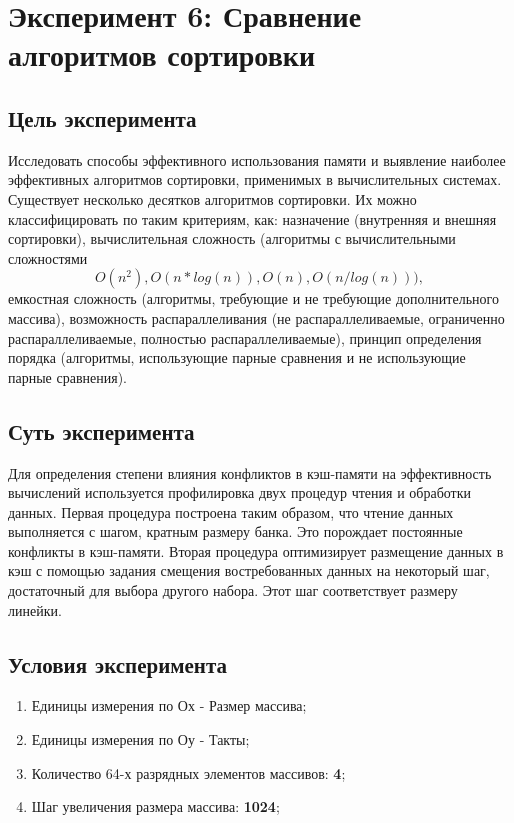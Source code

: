 \chapter{Эксперимент 6: Сравнение алгоритмов сортировки}

\section{Цель эксперимента}
Исследовать способы эффективного использования памяти и выявление наиболее эффективных алгоритмов сортировки, применимых в вычислительных системах. 
Существует несколько десятков алгоритмов сортировки. Их можно классифицировать по таким критериям, как: назначение (внутренняя и внешняя сортировки), вычислительная сложность (алгоритмы с вычислительными сложностями $$O(n^2), O(n*log(n)), O(n), O(n/log(n))),$$ емкостная сложность (алгоритмы, требующие и не требующие дополнительного массива), возможность распараллеливания (не распараллеливаемые, ограниченно распараллеливаемые, полностью распараллеливаемые), принцип определения порядка (алгоритмы, использующие парные сравнения и не использующие парные сравнения). 

\section{Суть эксперимента}
Для определения степени влияния конфликтов в кэш-памяти на эффективность вычислений используется профилировка двух процедур чтения и обработки данных. Первая процедура построена таким образом, что чтение данных выполняется с шагом, кратным размеру банка. Это порождает постоянные конфликты в кэш-памяти. Вторая процедура оптимизирует размещение данных в кэш с помощью задания смещения востребованных данных на некоторый шаг, достаточный для выбора другого набора. Этот шаг соответствует размеру линейки. 

\section{Условия эксперимента}
\begin{enumerate}
    \item Единицы измерения по Ох - Размер массива;
    \item Единицы измерения по Оу - Такты;
    \item Количество 64-х разрядных элементов массивов: \textbf{4};
    \item Шаг увеличения размера массива: \textbf{1024};
\end{enumerate}

